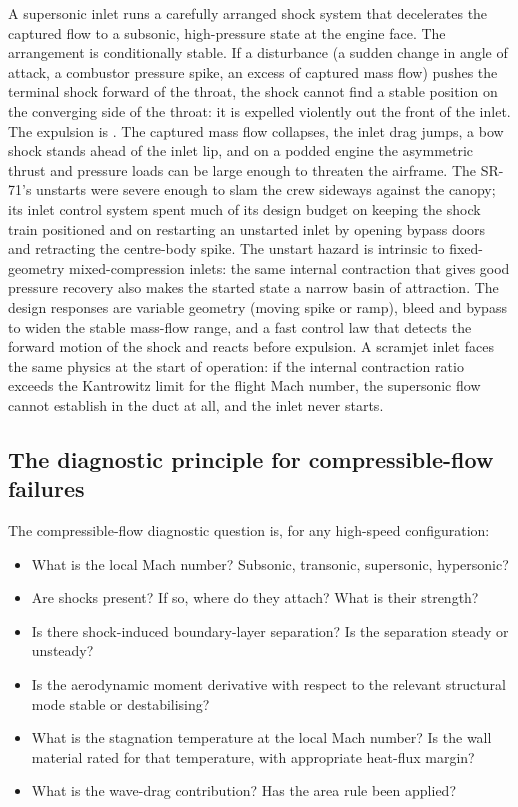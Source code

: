 A supersonic inlet runs a carefully arranged shock system that
decelerates the captured flow to a subsonic, high-pressure state at
the engine face. The arrangement is conditionally stable. If a
disturbance (a sudden change in angle of attack, a combustor pressure
spike, an excess of captured mass flow) pushes the terminal shock
forward of the throat, the shock cannot find a stable position on the
converging side of the throat: it is expelled violently out the front
of the inlet. The expulsion is . The captured mass
flow collapses, the inlet drag jumps, a bow shock stands ahead of the
inlet lip, and on a podded engine the asymmetric thrust and pressure
loads can be large enough to threaten the airframe. The SR-71's
unstarts were severe enough to slam the crew sideways against the
canopy; its inlet control system spent much of its design budget on
keeping the shock train positioned and on restarting an unstarted
inlet by opening bypass doors and retracting the centre-body spike.
The unstart hazard is intrinsic to fixed-geometry mixed-compression
inlets: the same internal contraction that gives good pressure
recovery also makes the started state a narrow basin of attraction.
The design responses are variable geometry (moving spike or ramp),
bleed and bypass to widen the stable mass-flow range, and a fast
control law that detects the forward motion of the shock and reacts
before expulsion. A scramjet inlet faces the same physics at the
start of operation: if the internal contraction ratio exceeds the
Kantrowitz limit for the flight Mach number, the supersonic flow
cannot establish in the duct at all, and the inlet never starts.

\subsection{The diagnostic principle for compressible-flow failures}

The compressible-flow diagnostic question is, for any high-speed
configuration:

\begin{itemize}[leftmargin=*]
  \item What is the local Mach number? Subsonic, transonic,
    supersonic, hypersonic?
  \item Are shocks present? If so, where do they attach? What is
    their strength?
  \item Is there shock-induced boundary-layer separation? Is the
    separation steady or unsteady?
  \item Is the aerodynamic moment derivative with respect to the
    relevant structural mode stable or destabilising?
  \item What is the stagnation temperature at the local Mach
    number? Is the wall material rated for that temperature, with
    appropriate heat-flux margin?
  \item What is the wave-drag contribution? Has the area rule
    been applied?
\end{itemize}

